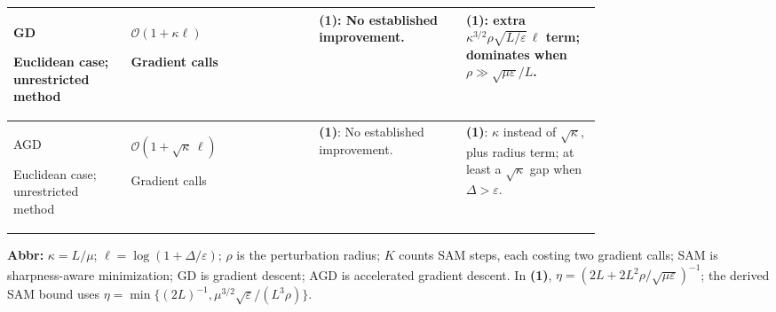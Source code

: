 \begin{table}[tp]
\begin{threeparttable}
\begin{tabularx}{\linewidth}{@{}>{\raggedright\arraybackslash}p{0.20\linewidth}>{\raggedright\arraybackslash}p{0.32\linewidth}>{\raggedright\arraybackslash}p{0.25\linewidth}>{\raggedright\arraybackslash}X@{}}
\midrule
GD \citep[Thm.~1]{SmoothPLKarimi2020v4}\par Euclidean case; unrestricted method
& $\mathcal{O}(1+\kappa\ell)$\par Gradient calls
& \textbf{(1)}: No established improvement.
& \textbf{(1)}: extra $\kappa^{3/2}\rho\sqrt{L/\varepsilon}\,\ell$ term; dominates when $\rho\gg\sqrt{\mu\varepsilon}/L$. \\
\midrule
AGD \citep[\S2.2, scheme (2.2.22)]{rscNesterov2018}\par Euclidean case; unrestricted method
& $\mathcal{O}(1+\sqrt{\kappa}\,\ell)$\par Gradient calls
& \textbf{(1)}: No established improvement.
& \textbf{(1)}: $\kappa$ instead of $\sqrt\kappa$, plus radius term; at least a $\sqrt\kappa$ gap when $\Delta>\varepsilon$. \\
\bottomrule
\end{tabularx}
\begin{tablenotes}[flushleft]\footnotesize
\item[] \textbf{Abbr:} $\kappa=L/\mu$; $\ell=\log(1+\Delta/\varepsilon)$; $\rho$ is the perturbation radius; $K$ counts SAM steps, each costing two gradient calls; SAM is sharpness-aware minimization; GD is gradient descent; AGD is accelerated gradient descent. In \textbf{(1)}, $\eta=(2L+2L^2\rho/\sqrt{\mu\varepsilon})^{-1}$; the derived SAM bound uses $\eta=\min\{(2L)^{-1},\mu^{3/2}\sqrt\varepsilon/(L^3\rho)\}$.
\end{tablenotes}
\end{threeparttable}
\end{table}
\clearpage
